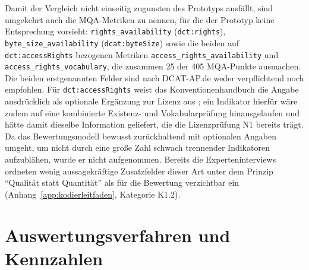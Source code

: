Damit der Vergleich nicht einseitig zugunsten des Prototyps ausfällt, sind umgekehrt auch
die MQA-Metriken zu nennen, für die der Prototyp keine Entsprechung vorsieht:
\texttt{rights\_availability} (\texttt{dct:rights}), \texttt{byte\_size\_availability}
(\texttt{dcat:byteSize}) sowie die beiden auf \texttt{dct:accessRights} bezogenen Metriken
\texttt{access\_\allowbreak rights\_\allowbreak availability} und
\texttt{access\_\allowbreak rights\_\allowbreak vocabulary}, die zusammen 25 der
405 MQA-Punkte ausmachen. Die beiden erstgenannten Felder sind nach DCAT-AP.de weder
verpflichtend noch empfohlen. Für \texttt{dct:accessRights} weist das
Konventionenhandbuch die Angabe ausdrücklich als optionale Ergänzung zur Lizenz aus
\cite{DCATAPDEImplRules2}; ein Indikator hierfür wäre zudem auf eine kombinierte
Existenz- und Vokabularprüfung hinausgelaufen und hätte damit dieselbe Information
geliefert, die die Lizenzprüfung N1 bereits trägt. Da das Bewertungsmodell bewusst
zurückhaltend mit optionalen Angaben umgeht, um nicht durch eine große Zahl schwach
trennender Indikatoren aufzublähen, wurde er nicht aufgenommen. Bereits die
Experteninterviews ordneten wenig aussagekräftige Zusatzfelder dieser Art unter dem
Prinzip \enquote{Qualität statt Quantität} als für die Bewertung verzichtbar ein
(Anhang~\ref{app:kodierleitfaden}, Kategorie K1.2).

\section{Auswertungsverfahren und Kennzahlen}
\label{sec:eval_auswertungsverfahren}

